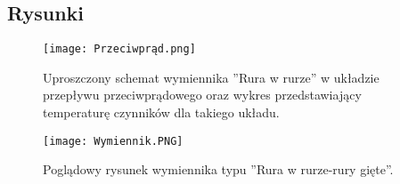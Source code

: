 \pagebreak
\subsection{Rysunki}
    \vspace{20px}
    \begin{figure}[ht]
        \centering
        \texttt{[image: Przeciwprąd.png]}
            \caption{Uproszczony schemat wymiennika ''Rura w rurze'' w układzie przepływu przeciwprądowego oraz wykres przedstawiający temperaturę czynników dla takiego układu.}
        \centering
        \texttt{[image: Wymiennik.PNG]}
            \caption{Poglądowy rysunek wymiennika typu ''Rura w rurze-rury gięte''.}
    \end{figure}

